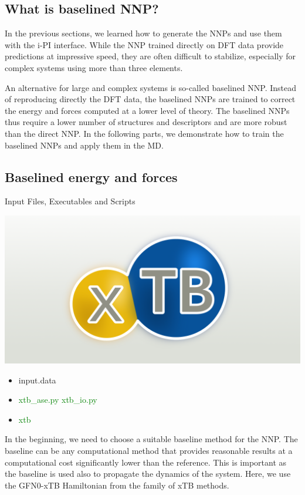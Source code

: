 \documentclass[12pt]{article}
\begin{document}
\subsection{What is baselined NNP?}
In the previous sections, we learned how to generate the NNPs and use them with the i-PI interface. While the NNP trained directly on DFT data provide predictions at impressive speed, they are often difficult to stabilize, especially for complex systems using more than three elements. 

An alternative for large and complex systems is so-called baselined NNP.\cite{ramakrishnan2015big} Instead of reproducing directly the DFT data, the baselined NNPs are trained to correct the energy and forces computed at a lower level of theory. The baselined NNPs thus require a lower number of structures and descriptors and are more robust than the direct NNP. In the following parts, we demonstrate how to train the baselined NNPs and apply them in the MD.
%
\subsection{Baselined energy and forces}
\begin{mybox2}{{Input Files, Executables and Scripts}}
\begin{minipage}[c]{0.5\linewidth}
\includegraphics[scale=0.15]{latex_files/xtb.png}
\end{minipage}
\begin{minipage}[c]{0.5\linewidth}
\begin{itemize}
    \item input.data
    \item \textcolor{green}{xtb\_ase.py xtb\_io.py}
     
    \item \textcolor{green}{xtb}
\end{itemize}
\end{minipage}
\end{mybox2}
In the beginning, we need to choose a suitable baseline method for the NNP. The baseline can be any computational method that provides reasonable results at a computational cost significantly lower than the reference. This is important as the baseline is used also to propagate the dynamics of the system. Here, we use the GFN0-xTB Hamiltonian from the family of xTB methods.\cite{https://doi.org/10.1002/wcms.1493} 
\end{document}
